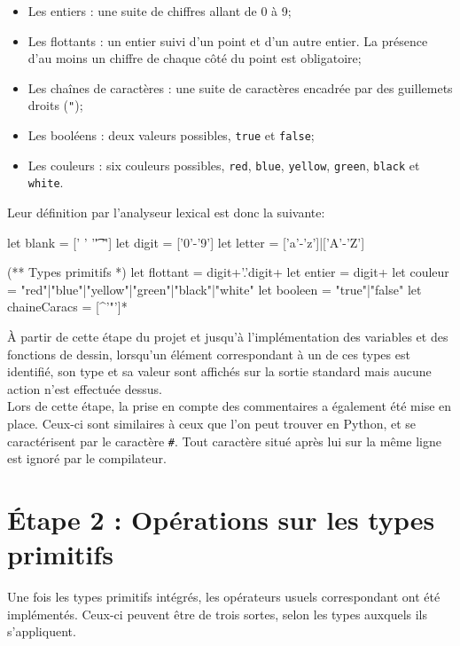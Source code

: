 \documentclass[a4paper, 12pt]{report}
\begin{document}
    \begin{itemize}
    	\item Les entiers : une suite de chiffres allant de 0 à 9;
    	\item Les flottants : un entier suivi d'un point et d'un autre entier. La présence d'au moins un chiffre de chaque côté du point est obligatoire;
    	\item Les cha\^ines de caractères : une suite de caractères encadrée par des guillemets droits (\texttt{"});
    	\item Les booléens : deux valeurs possibles, \texttt{true} et \texttt{false};
    	\item Les couleurs : six couleurs possibles, \texttt{red}, \texttt{blue}, \texttt{yellow}, \texttt{green}, \texttt{black} et \texttt{white}.\\
    \end{itemize}
    
    Leur définition par l'analyseur lexical est donc la suivante:
    
    \begin{verbatimtab}[4]
    	let blank = [' ' '\t' '\r']
		let digit = ['0'-'9']
		let letter = ['a'-'z']|['A'-'Z']

		(** Types primitifs *)
		let flottant = digit+'.'digit+
		let entier = digit+
		let couleur = "red"|"blue"|"yellow"|"green"|"black"|"white"
		let booleen = "true"|"false"
		let chaineCaracs =  [^'"']*
    \end{verbatimtab}
    
    \`A partir de cette étape du projet et jusqu'à l'implémentation des variables et des fonctions de dessin, lorsqu'un élément correspondant à un de ces types est identifié, son type et sa valeur sont affichés sur la sortie standard mais aucune action n'est effectuée dessus.\\
    
    Lors de cette étape, la prise en compte des commentaires a également été mise en place. Ceux-ci sont similaires à ceux que l'on peut trouver en Python, et se caractérisent par le caractère \texttt{\#}. Tout caractère situé après lui sur la même ligne est ignoré par le compilateur.\\
    
\chapter{\'Etape 2 : Opérations sur les types primitifs}

	Une fois les types primitifs intégrés, les opérateurs usuels correspondant ont été implémentés. Ceux-ci peuvent être de trois sortes, selon les types auxquels ils s'appliquent.\\
	
\end{document}
